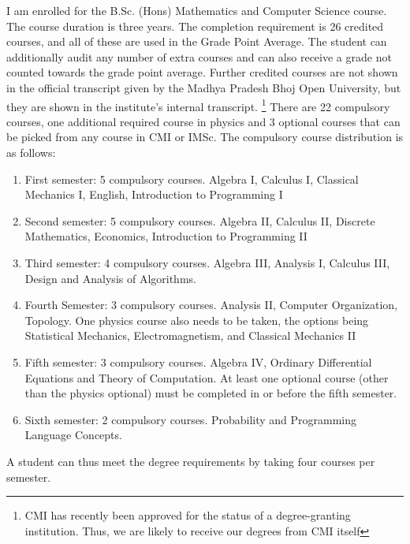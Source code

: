 \documentclass[a4paper]{amsart}
\begin{document}
I am enrolled for the B.Sc. (Hons) Mathematics and Computer Science
course. The course duration is three years.  The completion
requirement is 26 credited courses, and all of these are used in the
Grade Point Average.  The student can additionally audit any number of
extra courses and can also receive a grade not counted towards the
grade point average. Further credited courses are not shown in the
official transcript given by the Madhya Pradesh Bhoj Open University,
but they are shown in the institute's internal transcript.
\footnote{CMI has recently been approved for the status of a
  degree-granting institution. Thus, we are likely to receive our
  degrees from CMI itself} There are 22 compulsory courses, one
additional required course in physics and 3 optional courses that can
be picked from any course in CMI or IMSc. The compulsory course
distribution is as follows:

\begin{enumerate}

\item First semester: 5 compulsory courses. Algebra I, Calculus I,
  Classical Mechanics I, English, Introduction to Programming I

\item Second semester: 5 compulsory courses. Algebra II, Calculus II,
  Discrete Mathematics, Economics, Introduction to Programming II

\item Third semester: 4 compulsory courses. Algebra III, Analysis I,
  Calculus III, Design and Analysis of Algorithms.

\item Fourth Semester: 3 compulsory courses. Analysis II, Computer
  Organization, Topology. One physics course also needs to be taken,
  the options being Statistical Mechanics, Electromagnetism, and
  Classical Mechanics II

\item Fifth semester: 3 compulsory courses. Algebra IV, Ordinary
  Differential Equations and Theory of Computation.  At least one
  optional course (other than the physics optional) must be completed
  in or before the fifth semester.

\item Sixth semester: 2 compulsory courses. Probability and
  Programming Language Concepts.

\end{enumerate}

A student can thus meet the degree requirements by taking four courses
per semester.
\end{document}
